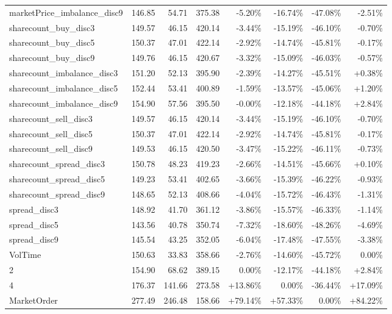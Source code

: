 \begin{table}[ht]
{\begin{tabular}{lRRR|RRRR}
marketPrice\_imbalance\_disc9      &    146.85 &   54.71 &  375.38 &   -5.20\% &  -16.74\% &  -47.08\% &       -2.51\% \\
sharecount\_buy\_disc3         &    149.57 &   46.15 &  420.14 &   -3.44\% &  -15.19\% &  -46.10\% &       -0.70\% \\
sharecount\_buy\_disc5         &    150.37 &   47.01 &  422.14 &   -2.92\% &  -14.74\% &  -45.81\% &       -0.17\% \\
sharecount\_buy\_disc9         &    149.76 &   46.15 &  420.67 &   -3.32\% &  -15.09\% &  -46.03\% &       -0.57\% \\
sharecount\_imbalance\_disc3   &    151.20 &   52.13 &  395.90 &   -2.39\% &  -14.27\% &  -45.51\% &        +0.38\% \\
sharecount\_imbalance\_disc5   &    152.44 &   53.41 &  400.89 &   -1.59\% &  -13.57\% &  -45.06\% &        +1.20\% \\
sharecount\_imbalance\_disc9   &    154.90 &   57.56 &  395.50 &   -0.00\% &  -12.18\% &  -44.18\% &        +2.84\% \\
sharecount\_sell\_disc3        &    149.57 &   46.15 &  420.14 &   -3.44\% &  -15.19\% &  -46.10\% &       -0.70\% \\
sharecount\_sell\_disc5        &    150.37 &   47.01 &  422.14 &   -2.92\% &  -14.74\% &  -45.81\% &       -0.17\% \\
sharecount\_sell\_disc9        &    149.53 &   46.15 &  420.50 &   -3.47\% &  -15.22\% &  -46.11\% &       -0.73\% \\
sharecount\_spread\_disc3      &    150.78 &   48.23 &  419.23 &   -2.66\% &  -14.51\% &  -45.66\% &        +0.10\% \\
sharecount\_spread\_disc5      &    149.23 &   53.41 &  402.65 &   -3.66\% &  -15.39\% &  -46.22\% &       -0.93\% \\
sharecount\_spread\_disc9      &    148.65 &   52.13 &  408.66 &   -4.04\% &  -15.72\% &  -46.43\% &       -1.31\% \\
spread\_disc3                 &    148.92 &   41.70 &  361.12 &   -3.86\% &  -15.57\% &  -46.33\% &       -1.14\% \\
spread\_disc5                 &    143.56 &   40.78 &  350.74 &   -7.32\% &  -18.60\% &  -48.26\% &       -4.69\% \\
spread\_disc9                 &    145.54 &   43.25 &  352.05 &   -6.04\% &  -17.48\% &  -47.55\% &       -3.38\% \\
\midrule
VolTime                      &    150.63 &   33.83 &  358.66 &   -2.76\% &  -14.60\% &  -45.72\% &        0.00\% \\
2                            &    154.90 &   68.62 &  389.15 &    0.00\% &  -12.17\% &  -44.18\% &        +2.84\% \\
4                            &    176.37 &  141.66 &  273.58 &   +13.86\% &    0.00\% &  -36.44\% &       +17.09\% \\
MarketOrder                  &    277.49 &  246.48 &  158.66 &   +79.14\% &   +57.33\% &    0.00\% &       +84.22\% \\
\bottomrule
\end{tabular}
}


\end{table}
